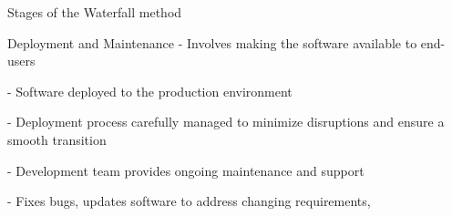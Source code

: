\begin{frame}{Stages of the Waterfall method}
    \begin{block}{Deployment and Maintenance}
        - Involves making the software available to end-users 
        
        - Software deployed to the production environment
        
        - Deployment process carefully managed to minimize disruptions and ensure a smooth transition
        
        - Development team provides ongoing maintenance and support
        
        - Fixes bugs, updates software to address changing requirements,
                
    \end{block}   

\end{frame}